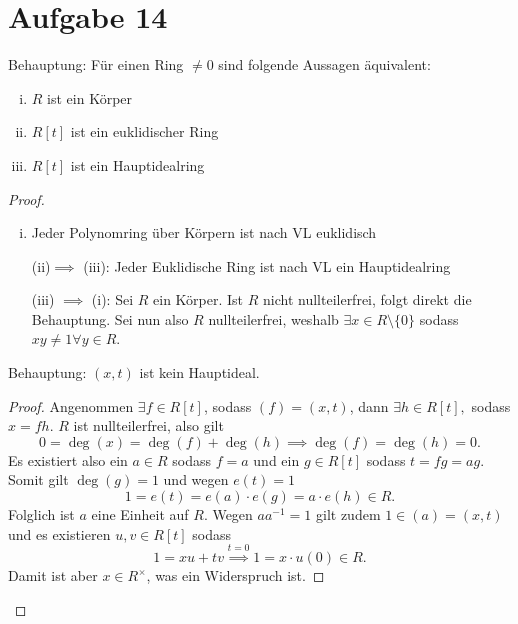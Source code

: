 \documentclass{article}
\theoremstyle{definition}
\begin{document}
\section*{Aufgabe 14}
Behauptung: Für einen Ring $\neq 0$ sind folgende Aussagen äquivalent:
\begin{enumerate}[(i)]
	\item $R$ ist ein Körper
	\item $R[t]$ ist ein euklidischer Ring
	\item $R[t]$ ist ein Hauptidealring
\end{enumerate}
\begin{proof}
	\begin{enumerate}[(i)$\implies$ (ii):]
		\item Jeder Polynomring über Körpern ist nach VL euklidisch
		\item [(ii)$\implies$ (iii):]Jeder Euklidische Ring ist nach VL ein Hauptidealring
		\item [(iii) $\implies$ (i):] Sei $R$ ein Körper. Ist $R$ nicht nullteilerfrei, folgt direkt die Behauptung. Sei nun also $R$ nullteilerfrei, weshalb $\exists x\in R\setminus\{0\}$ sodass $xy\neq 1 \forall y\in R$.
	\end{enumerate}
	Behauptung: $(x,t)$ ist kein Hauptideal. 
	\begin{proof}
		Angenommen $\exists f\in R[t]$, sodass $(f)=(x,t)$, dann $\exists h\in R[t],$ sodass $x=fh.$ $R$ ist nullteilerfrei, also gilt 
		$$0=\deg(x)=\deg(f)+\deg(h)\implies \deg(f)=\deg(h)=0.$$
		Es existiert also ein $a\in R$ sodass $f=a$ und ein $g\in R[t]$ sodass $t=fg=ag.$ Somit gilt $\deg(g)=1$ und wegen $e(t)=1$
		$$ 1=e(t)=e(a)\cdot e(g)=a\cdot e(h)\in R.$$
		Folglich ist $a$ eine Einheit auf $R$. Wegen $aa^{-1}=1 $ gilt zudem $1\in (a)=(x,t)$ und es existieren $u,v\in R[t]$ sodass 
		$$1=xu+tv\overset{t=0}{\implies}1=x\cdot u(0)\in R.$$
		Damit ist aber $x\in R^{\times}$, was ein Widerspruch ist.
\end{proof}
\end{proof}
\end{document}
